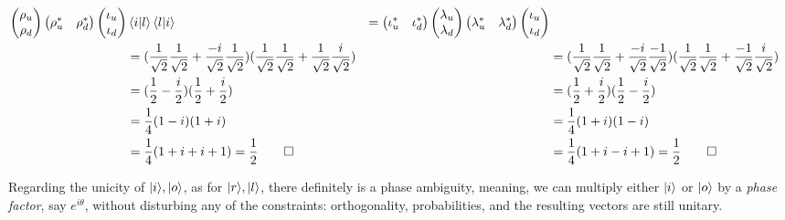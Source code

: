 \documentclass[solutions.tex]{subfiles}
\begin{document}
\begin{align*}
\begin{pmatrix}
	\rho_u \\
	\rho_d \\
\end{pmatrix}
\begin{pmatrix}
	\rho_u^* & \rho_d^* \\
\end{pmatrix}
\begin{pmatrix}
	\iota_u \\
	\iota_d \\
\end{pmatrix} &
\left\langle i \middle| l \right\rangle\left\langle l \middle| i \right\rangle &=
\begin{pmatrix}
	\iota_u^* & \iota_d^* \\
\end{pmatrix}
\begin{pmatrix}
	\lambda_u \\
	\lambda_d \\
\end{pmatrix}
\begin{pmatrix}
	\lambda_u^* & \lambda_d^* \\
\end{pmatrix}
\begin{pmatrix}
	\iota_u \\
	\iota_d \\
\end{pmatrix} \\
~ &= (\frac1{\sqrt2}\frac1{\sqrt2}+\frac{-i}{\sqrt2}\frac{1}{\sqrt2})
(\frac1{\sqrt2}\frac1{\sqrt2}+\frac{1}{\sqrt2}\frac{i}{\sqrt2})
& ~ &= (\frac1{\sqrt2}\frac1{\sqrt2}+\frac{-i}{\sqrt2}\frac{-1}{\sqrt2})
(\frac1{\sqrt2}\frac1{\sqrt2}+\frac{-1}{\sqrt2}\frac{i}{\sqrt2}) \\
~ &= (\frac1{2}-\frac{i}{2})(\frac1{2}+\frac{i}{2})
& ~ &= (\frac1{2}+\frac{i}{2})(\frac1{2}-\frac{i}{2}) \\
~ &= \frac1{4}(1-i)(1+i)
& ~ &= \frac1{4}(1+i)(1-i) \\
~ &= \frac1{4}(1+i+i+1) = \frac1{2}\qed
& ~ &= \frac1{4}(1+i-i+1) = \frac1{2}\qed \\
\end{align*}

\hrr

Regarding the unicity of $|i\rangle, |o\rangle$, as for $|r\rangle, |l\rangle$,
there definitely is a phase ambiguity, meaning, we can multiply either
$|i\rangle$ or $|o\rangle$ by a \textit{phase factor}, say $e^{i\theta}$,
without disturbing any of the constraints: orthogonality, probabilities,
and the resulting vectors are still unitary. \\
\end{document}
